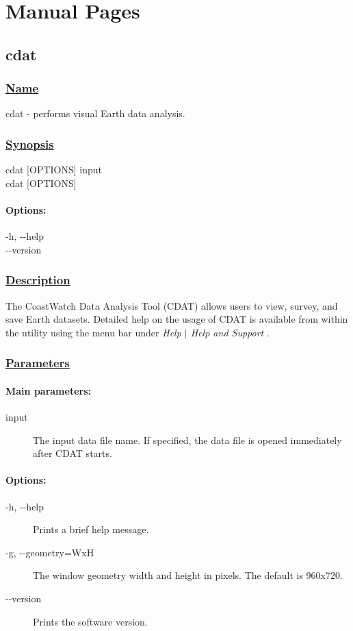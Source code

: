 \chapter{Manual Pages}
\label{manual}
\section{cdat} \hypertarget{cdat}{}
\subsection*{\underline{Name}}


   cdat - performs visual Earth data analysis.  
\subsection*{\underline{Synopsis}}


  cdat [OPTIONS] input \\ 
 cdat [OPTIONS] 
\subsubsection*{Options:}


  -h, -{-}help \\ 
 -{-}version \\ 

\subsection*{\underline{Description}}


 The CoastWatch Data Analysis Tool (CDAT) allows users to view, survey, and save Earth datasets. Detailed help on the usage of CDAT is available from within the utility using the menu bar under \emph{Help $|$ Help and Support}
.
\subsection*{\underline{Parameters}}
\subsubsection*{Main parameters:}
\begin{description}
\item[input]The input data file name. If specified, the data file is opened immediately after CDAT starts.

\end{description}
\subsubsection*{Options:}
\begin{description}
\item[-h, -{-}help]Prints a brief help message.
\item[-g, -{-}geometry=WxH]The window geometry width and height in pixels. The default is 960x720.
\item[-{-}version]Prints the software version.

\end{description}
